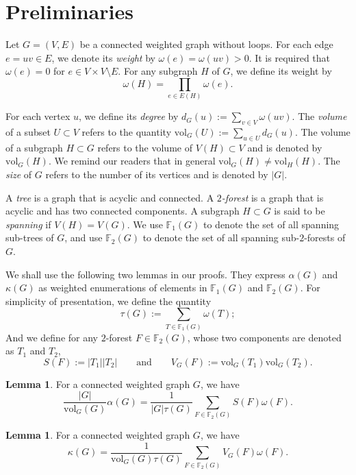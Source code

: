 \documentclass[11pt]{article}
\theoremstyle{definition}
\newtheorem{lemma}[theorem]{Lemma}
\newcommand{\vol}{\text{vol}}
\begin{document}
\section{Preliminaries}\label{section_pre}

Let $G=(V,E)$ be a connected weighted graph without loops. For each edge $e=uv\in E$, we denote its \emph{weight} by $\omega(e)=\omega(uv)>0$. It is required that $\omega(e)=0$ for $e \in V\times V\setminus E$. For any subgraph $H$ of $G$, we define its weight by
   \[\omega(H)=\prod_{e\in E(H)}\omega(e).\]

For each vertex $u$, we define its \emph{degree} by $d_G(u):=\sum_{v\in V} \omega(uv)$. The \emph{volume} of a subset $U\subset V$ refers to the quantity $\vol_G(U):=\sum_{u\in U}d_G(u)$. The volume of a subgraph $H\subset G$ refers to the volume of $V(H)\subset V$ and is denoted by $\vol_{G}(H)$. We remind our readers that in general $\vol_G(H)\neq \vol_H(H)$. The \emph{size} of $G$ refers to the number of its vertices and is denoted by $|G|$.

A \emph{tree} is a graph that is acyclic and connected. A \emph{$2$-forest} is a graph that is acyclic and has two connected components. A subgraph $H\subset G$ is said to be \emph{spanning} if $V(H)=V(G)$. We use $\mathbb{F}_1(G)$ to denote the set of all spanning sub-trees of $G$, and use $\mathbb{F}_2(G)$ to denote the set of all spanning sub-$2$-forests of $G$.

We shall use the following two lemmas in our proofs. They express $\alpha(G)$ and $\kappa(G)$ as weighted enumerations of elements in $\mathbb{F}_1(G)$ and $\mathbb{F}_2(G)$. For simplicity of presentation, we define the quantity 
   \[\tau(G):=\sum_{T\in \mathbb{F}_1(G)}\omega(T);\]
And we define for any $2$-forest $F\in \mathbb{F}_2(G)$, whose two components are denoted as $T_1$ and $T_2$,
  \[S(F):=|T_1||T_2|\qquad\text{and}\qquad V_G(F):=\vol_{G}(T_1)\vol_G(T_2).\]

\begin{lemma}\label{forestformula_aht}
For a connected weighted graph $G$, we have
   \[\frac{|G|}{\vol_G(G)}\alpha(G)=\frac{1}{|G|\tau(G)}\sum_{F\in \mathbb{F}_2(G)}S(F)\omega(F).\]
\end{lemma}

\begin{lemma}\label{forestformula_kemeny}
For a connected weighted graph $G$, we have
   \[\kappa(G)=\frac{1}{\vol_G(G)\tau(G)}\sum_{F\in \mathbb{F}_2(G)}V_G(F)\omega(F).\]
\end{lemma}
\end{document}
